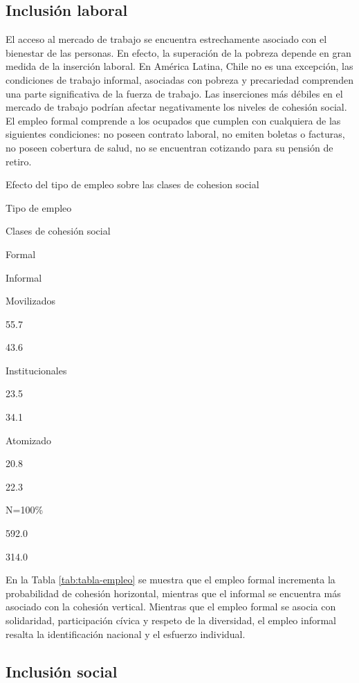 \documentclass[
  12pt,
]{book}
\begin{document}
\hypertarget{inclusiuxf3n-laboral}{%
\subsection{Inclusión laboral}\label{inclusiuxf3n-laboral}}

El acceso al mercado de trabajo se encuentra estrechamente asociado con el bienestar de las personas. En efecto, la superación de la pobreza depende en gran medida de la inserción laboral. En América Latina, Chile no es una excepción, las condiciones de trabajo informal, asociadas con pobreza y precariedad comprenden una parte significativa de la fuerza de trabajo. Las inserciones más débiles en el mercado de trabajo podrían afectar negativamente los niveles de cohesión social. El empleo formal comprende a los ocupados que cumplen con cualquiera de las siguientes condiciones: no poseen contrato laboral, no emiten boletas o facturas, no poseen cobertura de salud, no se encuentran cotizando para su pensión de retiro.

\label{tab:tabla-empleo}Efecto del tipo de empleo sobre las clases de cohesion social

Tipo de empleo

Clases de cohesión social

Formal

Informal

Movilizados

55.7

43.6

Institucionales

23.5

34.1

Atomizado

20.8

22.3

N=100\%

592.0

314.0

En la Tabla \ref{tab:tabla-empleo} se muestra que el empleo formal incrementa la probabilidad de cohesión horizontal, mientras que el informal se encuentra más asociado con la cohesión vertical. Mientras que el empleo formal se asocia con solidaridad, participación cívica y respeto de la diversidad, el empleo informal resalta la identificación nacional y el esfuerzo individual.

\hypertarget{inclusiuxf3n-social}{%
\subsection{Inclusión social}\label{inclusiuxf3n-social}}
\end{document}
